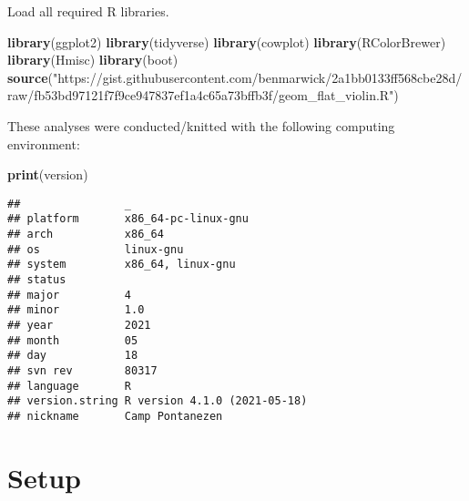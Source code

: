 \documentclass[]{book}
\newenvironment{Shaded}{\begin{snugshade}}{\end{snugshade}}
\newcommand{\KeywordTok}[1]{\textcolor[rgb]{0.13,0.29,0.53}{\textbf{#1}}}
\newcommand{\NormalTok}[1]{#1}
\newcommand{\StringTok}[1]{\textcolor[rgb]{0.31,0.60,0.02}{#1}}
\begin{document}
Load all required R libraries.

\begin{Shaded}
\begin{Highlighting}[]
\KeywordTok{library}\NormalTok{(ggplot2)}
\KeywordTok{library}\NormalTok{(tidyverse)}
\KeywordTok{library}\NormalTok{(cowplot)}
\KeywordTok{library}\NormalTok{(RColorBrewer)}
\KeywordTok{library}\NormalTok{(Hmisc)}
\KeywordTok{library}\NormalTok{(boot)}
\KeywordTok{source}\NormalTok{(}\StringTok{"https://gist.githubusercontent.com/benmarwick/2a1bb0133ff568cbe28d/raw/fb53bd97121f7f9ce947837ef1a4c65a73bffb3f/geom_flat_violin.R"}\NormalTok{)}
\end{Highlighting}
\end{Shaded}

These analyses were conducted/knitted with the following computing environment:

\begin{Shaded}
\begin{Highlighting}[]
\KeywordTok{print}\NormalTok{(version)}
\end{Highlighting}
\end{Shaded}

\begin{verbatim}
##                _                           
## platform       x86_64-pc-linux-gnu         
## arch           x86_64                      
## os             linux-gnu                   
## system         x86_64, linux-gnu           
## status                                     
## major          4                           
## minor          1.0                         
## year           2021                        
## month          05                          
## day            18                          
## svn rev        80317                       
## language       R                           
## version.string R version 4.1.0 (2021-05-18)
## nickname       Camp Pontanezen
\end{verbatim}

\hypertarget{setup-5}{%
\section{Setup}\label{setup-5}}
\end{document}

